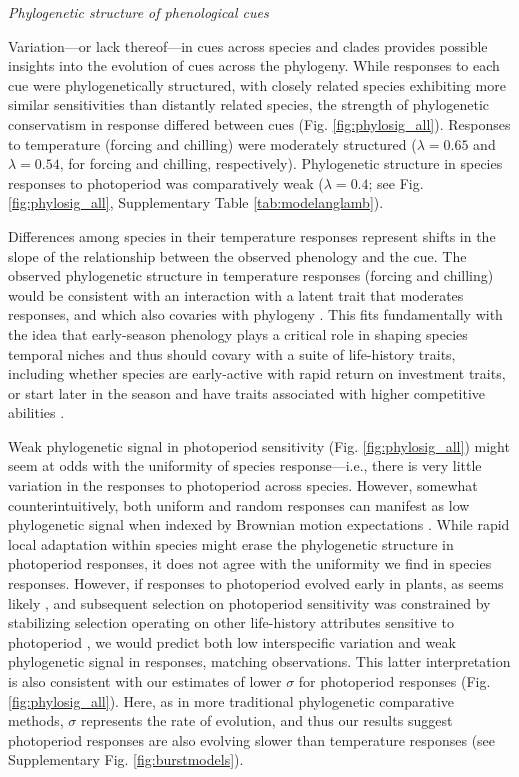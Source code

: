 \documentclass{article}
\begin{document}
\emph{Phylogenetic structure of phenological cues}

Variation---or lack thereof---in cues across species and clades provides possible insights into the evolution of cues across the phylogeny. While responses to each cue were phylogenetically structured, with closely related species exhibiting more similar sensitivities than distantly related species, the strength of phylogenetic conservatism in response differed between cues (Fig. \ref{fig:phylosig_all}). Responses to temperature (forcing and chilling) were moderately structured ($\lambda = 0.65$ and $\lambda = 0.54$, for forcing and chilling, respectively). Phylogenetic structure in species responses to photoperiod was comparatively weak ($\lambda= 0.4$; see Fig. \ref{fig:phylosig_all}, Supplementary Table \ref{tab:modelanglamb}).

Differences among species in their temperature responses represent shifts in the slope of the relationship between the observed phenology and the cue. The observed phylogenetic structure in temperature responses (forcing and chilling) would be consistent with an interaction with a latent trait that moderates responses, and which also covaries with phylogeny \citep{davies2019phylogenetically}. This fits fundamentally with the idea that early-season phenology plays a critical role in shaping species temporal niches \citep{gotelli1996} and thus should covary with a suite of life-history traits, including whether species are early-active with rapid return on investment traits, or start later in the season and have traits associated with higher competitive abilities \citep[e.g.,][]{Grime:1977sw,memegan2021}.

Weak phylogenetic signal in photoperiod sensitivity (Fig. \ref{fig:phylosig_all}) might seem at odds with the uniformity of species response---i.e., there is very little variation in the responses to photoperiod across species. However, somewhat counterintuitively, both uniform and random responses can manifest as low phylogenetic signal when indexed by Brownian motion expectations \citep{wiens2010niche}. While rapid local adaptation within species might erase the phylogenetic structure in photoperiod responses, it does not agree with the uniformity we find in species responses. However, if responses to photoperiod evolved early in plants, as seems likely \citep{serrano2017}, and subsequent selection on photoperiod sensitivity was constrained by stabilizing selection operating on other life-history attributes sensitive to photoperiod \citep[e.g.,][]{Rinne:1994,Wilczek2014,azeez2015}, we would predict both low interspecific variation and weak phylogenetic signal in responses, matching observations. This latter interpretation is also consistent with our estimates of lower $\sigma$ for photoperiod responses (Fig. \ref{fig:phylosig_all}). Here, as in more traditional phylogenetic comparative methods, $\sigma$ represents the rate of evolution, and thus our results suggest photoperiod responses are also evolving slower than temperature responses (see Supplementary Fig. \ref{fig:burstmodels}).
\end{document}
